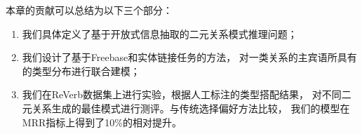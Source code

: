本章的贡献可以总结为以下三个部分：
\begin{enumerate}
\item{我们具体定义了基于开放式信息抽取的二元关系模式推理问题；}
\item{我们设计了基于Freebase和实体链接任务的方法，
对一类关系的主宾语所具有的类型分布进行联合建模；}
\item{我们在ReVerb数据集上进行实验，根据人工标注的类型搭配结果，
对不同二元关系生成的最佳模式进行测评。与传统选择偏好方法比较，
我们的模型在MRR指标上得到了10\%的相对提升。}
\end{enumerate}

